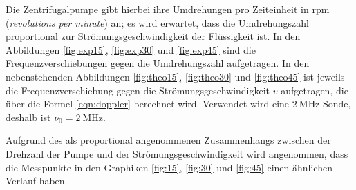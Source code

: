 Die Zentrifugalpumpe gibt hierbei ihre Umdrehungen pro Zeiteinheit in $\mathrm{rpm}$ (\textit{revolutions per minute}) an; es wird erwartet, dass die Umdrehungszahl 
proportional zur Strömungsgeschwindigkeit der Flüssigkeit ist. 
In den Abbildungen \ref{fig:exp15}, \ref{fig:exp30} und \ref{fig:exp45} sind die Frequenzverschiebungen gegen die Umdrehungszahl aufgetragen. 
In den nebenstehenden Abbildungen \ref{fig:theo15}, \ref{fig:theo30} und \ref{fig:theo45} ist jeweils die Frequenzverschiebung 
gegen die Strömungsgeschwindigkeit $v$ aufgetragen, die über die Formel \eqref{eqn:doppler}
berechnet wird. Verwendet wird eine $\SI{2}{\mega\hertz}$-Sonde, deshalb ist $\nu_0=\SI{2}{\mega\hertz}$. 

Aufgrund des als proportional angenommenen Zusammenhangs zwischen der Drehzahl der Pumpe und der Strömungsgeschwindigkeit 
wird angenommen, dass die Messpunkte in den Graphiken \ref{fig:15}, \ref{fig:30} und \ref{fig:45} einen ähnlichen Verlauf haben. 


